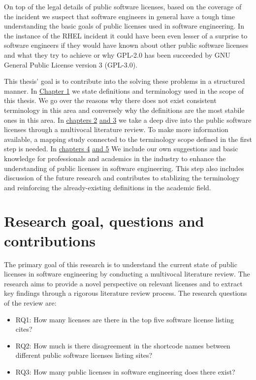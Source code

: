 On top of the legal details of public software licenses, based on the coverage of the incident we suspect that software engineers in general have a tough time understanding the basic goals of public licenses used in software engineering. In the instance of the RHEL incident it could have been even lesser of a surprise to software engineers if they would have known about other public software licenses and what they try to achieve or why GPL-2.0 has been succeeded by GNU General Public License version 3 (GPL-3.0).

This thesis' goal is to contribute into the solving these problems in a structured manner. In \hyperref[intro]{Chapter 1}  we state definitions and terminology used in the scope of this thesis. We go over the reasons why there does not exist consistent terminology in this area and conversely why the definitions are the most stabile ones in this area. In \hyperref[methods]{chapters 2} \hyperref[results]{and 3} we take a deep dive into the public software licenses through a multivocal literature review. To make more information available, a mapping study connected to the terminology scope defined in the first step is needed. In \hyperref[discussion]{chapters 4} \hyperref[conclusions]{and 5} We include our own suggestions and basic knowledge for professionals and academics in the industry to enhance the understanding of public licenses in software engineering. This step also includes discussion of the future research and contributes to stablizing the terminology and reinforcing the already-existing definitions in the academic field.

\section{Research goal, questions and contributions}
The primary goal of this research is to understand the current state of public licenses in software engineering by conducting a multivocal literature review. The research aims to provide a novel perspective on relevant licenses and to extract key findings through a rigorous literature review process. The research questions of the review are:
\begin{itemize}
	\item RQ1: How many licenses are there in the top five software license listing cites?
	\item RQ2: How much is there disagreement in the shortcode names between different public software licenses listing sites?
	\item RQ3: How many public licenses in software engineering does there exist?
\end{itemize}

